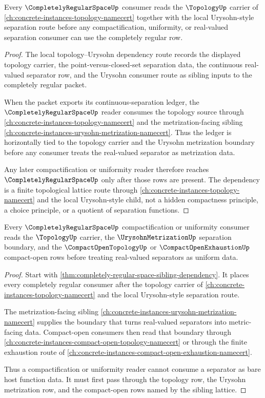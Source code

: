 \begin{theorem}
\label{thm:completely-regular-space-sibling-dependency}
Every $\CompletelyRegularSpaceUp$ consumer reads the $\TopologyUp$ carrier of \autoref{ch:concrete-instances-topology-namecert} together with the local Urysohn-style separation route before any compactification, uniformity, or real-valued separation consumer can use the completely regular row.
\end{theorem}
\begin{proof}
The local topology--Urysohn dependency route records the displayed topology carrier, the point-versus-closed-set separation data, the continuous real-valued separator row, and the Urysohn consumer route as sibling inputs to the completely regular packet.

When the packet exports its continuous-separation ledger, the $\CompletelyRegularSpaceUp$ reader consumes the topology source through \autoref{ch:concrete-instances-topology-namecert} and the metrization-facing sibling \autoref{ch:concrete-instances-urysohn-metrization-namecert}. Thus the ledger is horizontally tied to the topology carrier and the Urysohn metrization boundary before any consumer treats the real-valued separator as metrization data.

Any later compactification or uniformity reader therefore reaches $\CompletelyRegularSpaceUp$ only after those rows are present. The dependency is a finite topological lattice route through \autoref{ch:concrete-instances-topology-namecert} and the local Urysohn-style child, not a hidden compactness principle, a choice principle, or a quotient of separation functions.
\end{proof}

\begin{theorem}
\label{thm:completely-regular-space-compact-open-route}
Every $\CompletelyRegularSpaceUp$ compactification or uniformity consumer reads the $\TopologyUp$ carrier, the $\UrysohnMetrizationUp$ separation boundary, and the $\CompactOpenTopologyUp$ or $\CompactOpenExhaustionUp$ compact-open rows before treating real-valued separators as uniform data.
\end{theorem}
\begin{proof}
Start with \autoref{thm:completely-regular-space-sibling-dependency}. It places every completely regular consumer after the topology carrier of \autoref{ch:concrete-instances-topology-namecert} and the local Urysohn-style separation route.

The metrization-facing sibling \autoref{ch:concrete-instances-urysohn-metrization-namecert} supplies the boundary that turns real-valued separators into metric-facing data. Compact-open consumers then read that boundary through \autoref{ch:concrete-instances-compact-open-topology-namecert} or through the finite exhaustion route of \autoref{ch:concrete-instances-compact-open-exhaustion-namecert}.

Thus a compactification or uniformity reader cannot consume a separator as bare host function data. It must first pass through the topology row, the Urysohn metrization row, and the compact-open rows named by the sibling lattice.
\end{proof}
